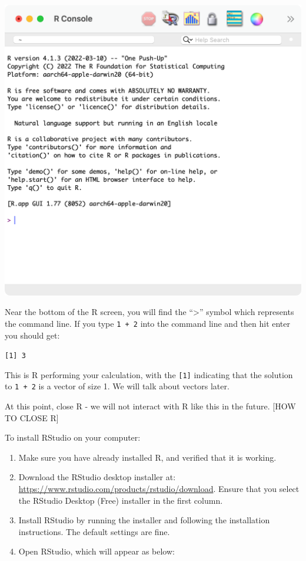 \documentclass[
]{memoir}
\providecommand{\tightlist}{%
  \setlength{\itemsep}{0pt}\setlength{\parskip}{0pt}}
\begin{document}
\includegraphics[width=0.8\linewidth]{img/R-screenshot}

Near the bottom of the R screen, you will find the ``\textgreater{}'' symbol which represents the command line. If you type \texttt{1\ +\ 2} into the command line and then hit enter you should get:

\texttt{{[}1{]}\ 3}

This is R performing your calculation, with the \texttt{{[}1{]}} indicating that the solution to \texttt{1\ +\ 2} is a vector of size 1. We will talk about vectors later.

At this point, close R - we will not interact with R like this in the future. {[}HOW TO CLOSE R{]}

To install RStudio on your computer:

\begin{enumerate}
\def\labelenumi{\arabic{enumi}.}
\tightlist
\item
  Make sure you have already installed R, and verified that it is working.
\item
  Download the RStudio desktop installer at: \url{https://www.rstudio.com/products/rstudio/download}. Ensure that you select the RStudio Desktop (Free) installer in the first column.
\item
  Install RStudio by running the installer and following the installation instructions. The default settings are fine.
\item
  Open RStudio, which will appear as below:
\end{enumerate}
\end{document}
